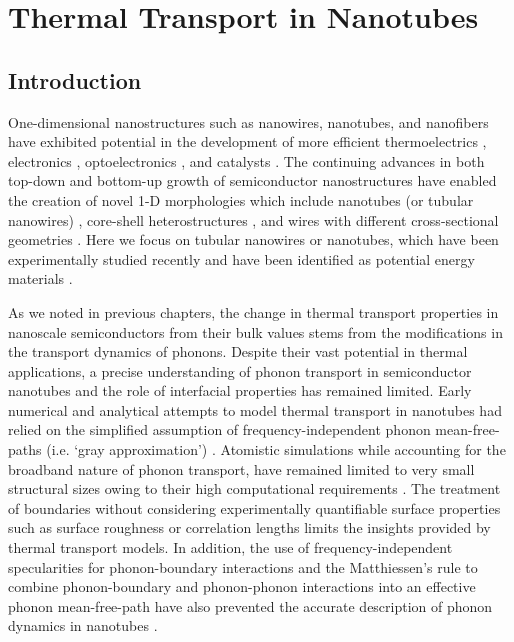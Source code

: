 \chapter{Thermal Transport in Nanotubes }
\label{chap:nt}
\section{Introduction}
One-dimensional nanostructures such as nanowires, nanotubes, and nanofibers have exhibited potential in the development of more efficient thermoelectrics \cite{NW_hochbaum}, electronics \cite{RN502,RN425}, optoelectronics \cite{RN421,RN420}, and catalysts \cite{RN424,RN426}. The continuing advances in both top-down and bottom-up growth of semiconductor nanostructures have enabled the creation of novel 1-D morphologies which include nanotubes (or tubular nanowires) \cite{RN427,RN429}, core-shell heterostructures \cite{RN452,RN141,RN432}, and wires with different cross-sectional geometries \cite{RN145,RN483}. Here we focus on tubular nanowires or nanotubes, which have been experimentally studied recently and have been identified as potential energy materials \cite{RN456,RN436}. 

As we noted in previous chapters, the change in thermal transport properties in nanoscale semiconductors from their bulk values stems from the modifications in the transport dynamics of phonons. Despite their vast potential in thermal applications, a precise understanding of phonon transport in semiconductor nanotubes and the role of interfacial properties has remained limited. Early numerical and analytical attempts to model thermal transport in nanotubes had relied on the simplified assumption of frequency-independent phonon mean-free-paths (i.e. ‘gray approximation’) \cite{RN431}. Atomistic simulations while accounting for the broadband nature of phonon transport, have remained limited to very small structural sizes owing to their high computational requirements \cite{RN432}. The treatment of boundaries without considering experimentally quantifiable surface properties such as surface roughness or correlation lengths limits the insights provided by thermal transport models. In addition, the use of frequency-independent specularities for phonon-boundary interactions and the Matthiessen’s rule to combine phonon-boundary and phonon-phonon interactions into an effective phonon mean-free-path have also prevented the accurate description of phonon dynamics in nanotubes \cite{RN437}.

